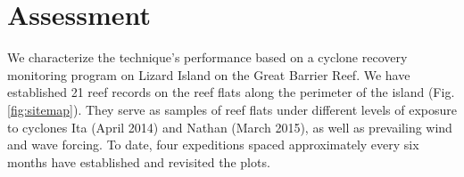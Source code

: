 \section{Assessment}

We characterize the technique's performance based on a cyclone recovery monitoring program on Lizard Island on the Great Barrier Reef. We have established 21 reef records on the reef flats along the perimeter of the island (Fig. \ref{fig:sitemap}). They serve as samples of reef flats under different levels of exposure to cyclones Ita (April 2014) and Nathan (March 2015), as well as prevailing wind and wave forcing. To date, four expeditions spaced approximately every six months have established and revisited the plots.
